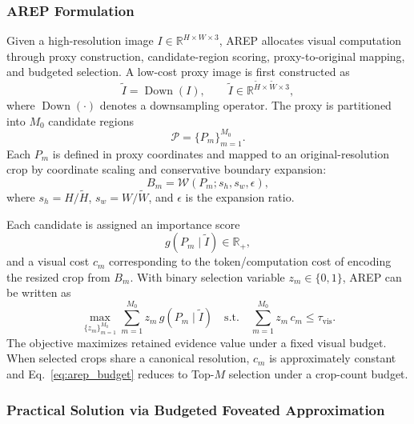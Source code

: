 \documentclass[journal,twoside,web]{ieeecolor}
\begin{document}
\subsubsection{AREP Formulation}
\label{sec:arep_formulation}

Given a high-resolution image $I \in \mathbb{R}^{H \times W \times 3}$, AREP allocates visual computation through proxy construction, candidate-region scoring, proxy-to-original mapping, and budgeted selection.
A low-cost proxy image is first constructed as
\begin{equation}
  \tilde I = \operatorname{Down}(I), \qquad \tilde I\in\mathbb{R}^{\tilde H\times\tilde W\times 3},
  \label{eq:proxy}
\end{equation}
where $\operatorname{Down}(\cdot)$ denotes a downsampling operator.
The proxy is partitioned into $M_0$ candidate regions
\begin{equation}
  \mathcal{P}=\{P_m\}_{m=1}^{M_0}.
\end{equation}
Each $P_m$ is defined in proxy coordinates and mapped to an original-resolution crop by coordinate scaling and conservative boundary expansion:
\begin{equation}
  B_m=\mathcal{W}(P_m; s_h,s_w,\epsilon),
  \label{eq:arep_mapping}
\end{equation}
where $s_h=H/\tilde H$, $s_w=W/\tilde W$, and $\epsilon$ is the expansion ratio.

Each candidate is assigned an importance score
\begin{equation}
  g(P_m \mid \tilde I)\in\mathbb{R}_{+},
\end{equation}
and a visual cost $c_m$ corresponding to the token/computation cost of encoding the resized crop from $B_m$.
With binary selection variable $z_m\in\{0,1\}$, AREP can be written as
\begin{equation}
  \max_{\{z_m\}_{m=1}^{M_0}}
  \sum_{m=1}^{M_0} z_m\, g(P_m \mid \tilde I)
  \quad
  \mathrm{s.t.}
  \quad
  \sum_{m=1}^{M_0} z_m\, c_m \le \tau_{\mathrm{vis}}.
  \label{eq:arep_budget}
\end{equation}
The objective maximizes retained evidence value under a fixed visual budget. When selected crops share a canonical resolution, $c_m$ is approximately constant and Eq.~\eqref{eq:arep_budget} reduces to Top-$M$ selection under a crop-count budget.

\subsubsection{Practical Solution via Budgeted Foveated Approximation}
\label{sec:arep_solution}
\end{document}
